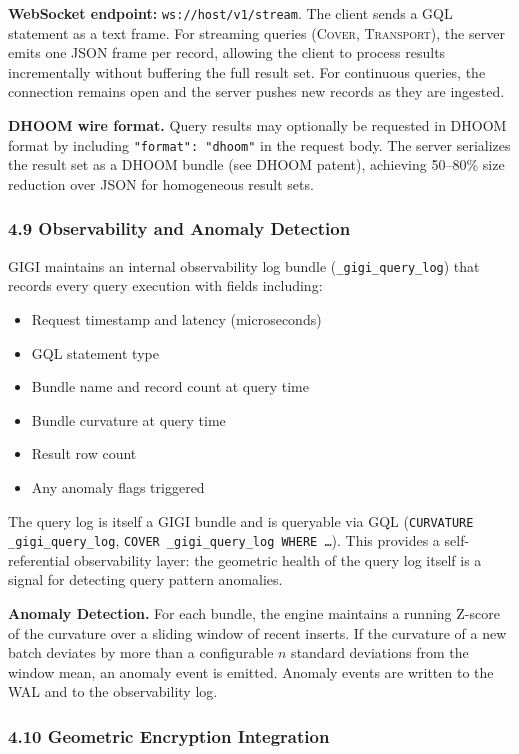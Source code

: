 \documentclass[11pt,letterpaper]{article}
\begin{document}
\textbf{WebSocket endpoint:} \texttt{ws://host/v1/stream}. The client sends a GQL statement as a text frame. For streaming queries (\textsc{Cover}, \textsc{Transport}), the server emits one JSON frame per record, allowing the client to process results incrementally without buffering the full result set. For continuous queries, the connection remains open and the server pushes new records as they are ingested.

\textbf{DHOOM wire format.} Query results may optionally be requested in DHOOM format by including \texttt{"format": "dhoom"} in the request body. The server serializes the result set as a DHOOM bundle (see DHOOM patent), achieving 50--80\% size reduction over JSON for homogeneous result sets.


\subsubsection*{4.9 Observability and Anomaly Detection}

GIGI maintains an internal observability log bundle (\texttt{\_gigi\_query\_log}) that records every query execution with fields including:
\begin{itemize}[nosep]
  \item Request timestamp and latency (microseconds)
  \item GQL statement type
  \item Bundle name and record count at query time
  \item Bundle curvature at query time
  \item Result row count
  \item Any anomaly flags triggered
\end{itemize}
The query log is itself a GIGI bundle and is queryable via GQL (\texttt{CURVATURE \_gigi\_query\_log}, \texttt{COVER \_gigi\_query\_log WHERE \ldots}). This provides a self-referential observability layer: the geometric health of the query log itself is a signal for detecting query pattern anomalies.

\textbf{Anomaly Detection.} For each bundle, the engine maintains a running Z-score of the curvature over a sliding window of recent inserts. If the curvature of a new batch deviates by more than a configurable $n$ standard deviations from the window mean, an anomaly event is emitted. Anomaly events are written to the WAL and to the observability log.


\subsubsection*{4.10 Geometric Encryption Integration}
\end{document}
